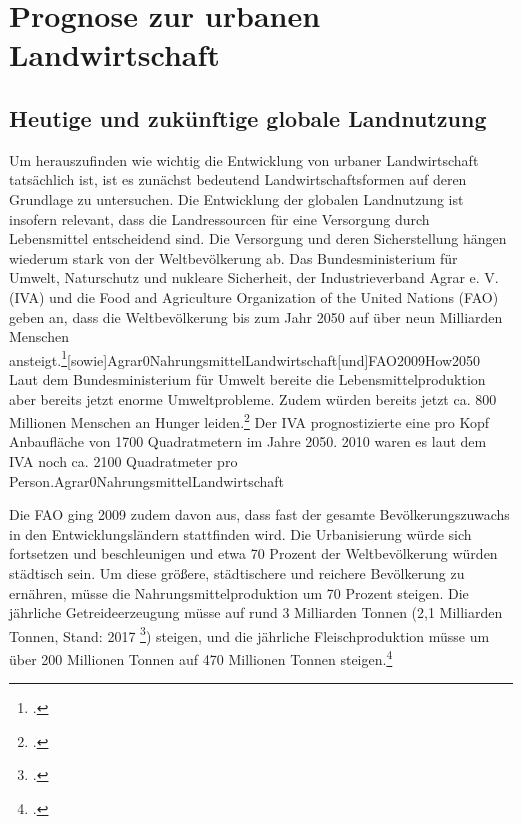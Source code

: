 \documentclass{scrartcl}
\begin{document}
\section{Prognose zur urbanen Landwirtschaft}

\subsection{Heutige und zukünftige globale Landnutzung}

Um herauszufinden wie wichtig die Entwicklung von urbaner Landwirtschaft tatsächlich ist, ist es zunächst bedeutend Landwirtschaftsformen auf deren Grundlage zu untersuchen. Die Entwicklung der globalen Landnutzung ist insofern relevant, dass die Landressourcen für eine Versorgung durch Lebensmittel entscheidend sind. Die Versorgung und deren Sicherstellung hängen wiederum stark von der Weltbevölkerung ab. Das Bundesministerium für Umwelt, Naturschutz und nukleare Sicherheit, der Industrieverband Agrar e. V. (IVA) und die Food and Agriculture Organization of the United Nations (FAO) geben an, dass die Weltbevölkerung bis zum Jahr 2050 auf über neun Milliarden Menschen ansteigt.\footcite[Vgl.]{BMU2016GlobaleUmweltfolgen}[sowie]{Agrar0NahrungsmittelLandwirtschaft}[und]{FAO2009How2050} Laut dem Bundesministerium für Umwelt bereite die Lebensmittelproduktion aber bereits jetzt enorme Umweltprobleme. Zudem würden bereits jetzt ca. 800 Millionen Menschen an Hunger leiden.\footcite[Vgl.]{BMU2016GlobaleUmweltfolgen} Der IVA prognostizierte eine pro Kopf Anbaufläche von 1700 Quadratmetern im Jahre 2050. 2010 waren es laut dem IVA noch ca. 2100 Quadratmeter pro Person.{Agrar0NahrungsmittelLandwirtschaft}

Die FAO ging 2009 zudem davon aus, dass fast der gesamte Bevölkerungszuwachs in den Entwicklungsländern stattfinden wird. Die Urbanisierung würde sich fortsetzen und beschleunigen und etwa 70 Prozent der Weltbevölkerung würden städtisch sein. Um diese größere, städtischere und reichere Bevölkerung zu ernähren, müsse die Nahrungsmittelproduktion um 70 Prozent steigen. Die jährliche Getreideerzeugung müsse auf rund 3 Milliarden Tonnen (2,1 Milliarden Tonnen, Stand: 2017 \footcite[Vgl.]{IGC}) steigen, und die jährliche Fleischproduktion müsse um über 200 Millionen Tonnen auf 470 Millionen Tonnen steigen.\footcite[Vgl.][S. 2]{FAO2009How2050}
\end{document}
